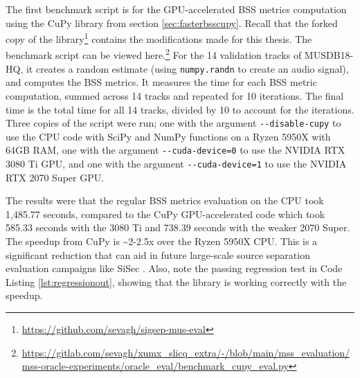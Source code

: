 \documentclass[report.tex]{subfiles}
\begin{document}
The first benchmark script is for the GPU-accelerated BSS metrics computation using the CuPy library from section \ref{sec:fasterbsscupy}. Recall that the forked copy of the library\footnote{\url{https://github.com/sevagh/sigsep-mus-eval}} contains the modifications made for this thesis. The benchmark script can be viewed here.\footnote{\url{https://gitlab.com/sevagh/xumx_slicq_extra/-/blob/main/mss_evaluation/mss-oracle-experiments/oracle_eval/benchmark_cupy_eval.py}} For the 14 validation tracks of MUSDB18-HQ, it creates a random estimate (using \Verb#numpy.randn# to create an audio signal), and computes the BSS metrics. It measures the time for each BSS metric computation, summed across 14 tracks and repeated for 10 iterations. The final time is the total time for all 14 tracks, divided by 10 to account for the iterations. Three copies of the script were run; one with the argument \Verb#--disable-cupy# to use the CPU code with SciPy and NumPy functions on a Ryzen 5950X with 64GB RAM, one with the argument \Verb#--cuda-device=0# to use the NVIDIA RTX 3080 Ti GPU, and one with the argument \Verb#--cuda-device=1# to use the NVIDIA RTX 2070 Super GPU.

The results were that the regular BSS metrics evaluation on the CPU took 1,485.77 seconds, compared to the CuPy GPU-accelerated code which took 585.33 seconds with the 3080 Ti and 738.39 seconds with the weaker 2070 Super. The speedup from CuPy is \textasciitilde 2-2.5x over the Ryzen 5950X CPU. This is a significant reduction that can aid in future large-scale source separation evaluation campaigns like SiSec \parencite{sisec2016, sisec2018}. Also, note the passing regression test in Code Listing \ref{lst:regressionout}, showing that the library is working correctly with the speedup.
\end{document}
